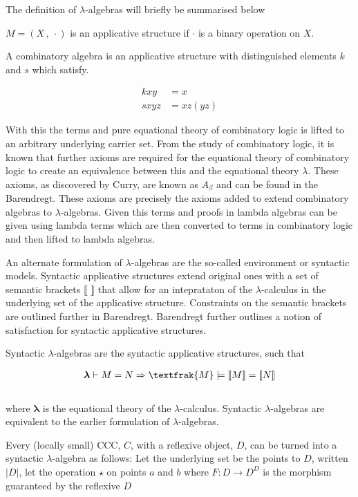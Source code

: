 \documentclass[a4paper,10pt]{article}
\begin{document}
The definition of $\lambda$-algebras will briefly be summarised below

$M = (X \, , \: \cdot)$ is an applicative structure if $\cdot$ is a binary operation on
$X$.


A combinatory algebra is an applicative structure with distinguished elements
$k$ and $s$ which satisfy.

\begin{align*}
kxy &= x \\
sxyz &= xz (yz)
\end{align*}

With this the terms and pure equational theory of combinatory logic is lifted to
an arbitrary underlying carrier set. From the study of combinatory logic, it is
known that further axioms are required for the equational theory of combinatory
logic to create an equivalence between this and the equational theory $\lambda$.
These axioms, as discovered by Curry, are known as $A_{\beta}$ and can be found
in the Barendregt. These axioms are precisely the axioms added to extend
combinatory algebras to $\lambda$-algebras. Given this terms and proofs in
lambda algebras can be given using lambda terms which are then converted to
terms in combinatory logic and then lifted to lambda algebras.


An alternate formulation of $\lambda$-algebras are the so-called environment or
syntactic models. Syntactic applicative structures extend original ones with a
set of semantic brackets $\llbracket  \, \, \rrbracket$ that allow for an
inteprataton of the $\lambda$-calculus in the underlying set of the applicative
structure. Constraints on the semantic brackets are outlined further in
Barendregt. Barendregt further outlines a notion of satisfaction for syntactic
applicative structures.

Syntactic $\lambda$-algebras are the syntactic applicative structures,
 such that

\begin{align*}
    \bm{\lambda} \vdash M = N \Rightarrow \textfrak{M} \models \llbracket M
    \rrbracket = \llbracket N \rrbracket
\end{align*}
\\

where $\bm{\lambda}$ is the equational theory of the $\lambda$-calculus.
Syntactic $\lambda$-algebras are equivalent to the earlier formulation of
$\lambda$-algebras.

Every (locally small) CCC, $C$, with a reflexive object, $D$, can be turned into
a syntactic $\lambda$-algebra as follows: Let the underlying set be the points
to $D$, written $|D|$, let the operation $\star$ on points $a$ and $b$ where $F
: D \rightarrow D^D$ is the morphism guaranteed by the reflexive $D$
\end{document}
